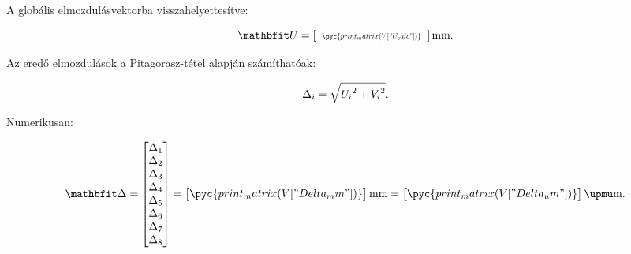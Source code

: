 A globális elmozdulásvektorba visszahelyettesítve:
\begin{myframe}
  \begin{equation}
    \siplaces{6}
    \rvec U = \left[
      \scalebox{.65}{
        $\begin{array}{c}
            \pyc{print_matrix(V["U_calc"])}
          \end{array}$
      }
      \right]
    \text{mm}
    \text.
  \end{equation}
\end{myframe}

Az eredő elmozdulások a Pitagorasz-tétel alapján számíthatóak:
\begin{myframe}
  \begin{equation}
    \Delta_i = \sqrt{{U_i}^2 + {V_i}^2}
    \text.
  \end{equation}
\end{myframe}

Numerikusan:
\begin{myframe}
  \begin{equation}
    \rvec{\Delta} = \begin{bmatrix}
      \Delta_1 \\
      \Delta_2 \\
      \Delta_3 \\
      \Delta_4 \\
      \Delta_5 \\
      \Delta_6 \\
      \Delta_7 \\
      \Delta_8 \\
    \end{bmatrix}
    =
    \siplaces{6}
    \begin{bmatrix}
      \pyc{print_matrix(V["Delta_mm"])}
    \end{bmatrix}
    \text{mm}
    =
    \siplaces{3}
    \begin{bmatrix}
      \pyc{print_matrix(V["Delta_um"])}
    \end{bmatrix}
    \upmu\text{m}
    \text.
  \end{equation}
\end{myframe}
